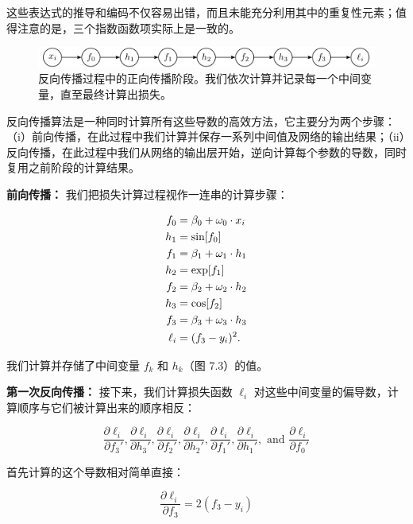 这些表达式的推导和编码不仅容易出错，而且未能充分利用其中的重复性元素；值得注意的是，三个指数函数项实际上是一致的。

\begin{figure}[ht!]
\centering
\includegraphics[width=0.7\linewidth]{png/chapter7/Train2BP1.png}
\caption{反向传播过程中的正向传播阶段。我们依次计算并记录每一个中间变量，直至最终计算出损失。}
\end{figure}

反向传播算法是一种同时计算所有这些导数的高效方法，它主要分为两个步骤：（i）前向传播，在此过程中我们计算并保存一系列中间值及网络的输出结果；（ii）反向传播，在此过程中我们从网络的输出层开始，逆向计算每个参数的导数，同时复用之前阶段的计算结果。

\textbf{前向传播：} 我们把损失计算过程视作一连串的计算步骤：



\begin{align}
f_0 &= \beta_0 + \omega_0 \cdot x_i \notag \\
h_1 &= \sin[f_0] \notag \\
f_1 &= \beta_1 + \omega_1 \cdot h_1 \notag \\
h_2 &= \exp[f_1] \notag \\
f_2 &= \beta_2 + \omega_2 \cdot h_2 \notag \\
h_3 &= \cos[f_2] \notag \\
f_3 &= \beta_3 + \omega_3 \cdot h_3 \notag \\
\ell_i &= (f_3 - y_i)^2. 
\end{align} 


我们计算并存储了中间变量 \(f_k\) 和 \(h_k\)（图 7.3）的值。


\textbf{第一次反向传播：} 接下来，我们计算损失函数 \(\ell_i\) 对这些中间变量的偏导数，计算顺序与它们被计算出来的顺序相反：


\begin{equation}
\frac{\partial \ell_i}{\partial f_3'}, \frac{\partial \ell_i}{\partial h_3'}, \frac{\partial \ell_i}{\partial f_2'}, \frac{\partial \ell_i}{\partial h_2'}, \frac{\partial \ell_i}{\partial f_1'}, \frac{\partial \ell_i}{\partial h_1'}, \text{ and } \frac{\partial \ell_i}{\partial f_0'} 
\end{equation}

首先计算的这个导数相对简单直接：

\begin{equation}
\frac{\partial \ell_i}{\partial f_3} = 2(f_3 - y_i) 
\end{equation}


